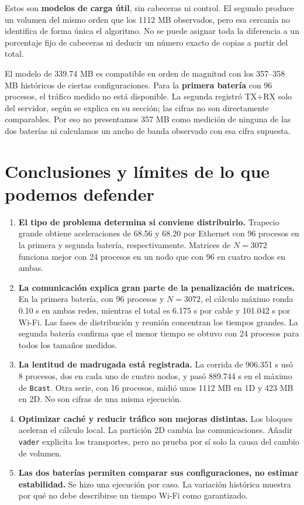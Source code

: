 Estos son \textbf{modelos de carga útil}, sin cabeceras ni control. El segundo produce un volumen del mismo orden que los 1112 MB observados, pero esa cercanía no identifica de forma única el algoritmo. No se puede asignar toda la diferencia a un porcentaje fijo de cabeceras ni deducir un número exacto de copias a partir del total.

El modelo de 339.74 MB es compatible en orden de magnitud con los 357--358 MB históricos de ciertas configuraciones. Para la \textbf{primera batería} con 96 procesos, el tráfico medido no está disponible. La segunda registró TX+RX solo del servidor, según se explica en su sección; las cifras no son directamente comparables. Por eso no presentamos 357 MB como medición de ninguna de las dos baterías ni calculamos un ancho de banda observado con esa cifra supuesta.

\clearpage
\section{Conclusiones y límites de lo que podemos defender}

\begin{enumerate}
\item \textbf{El tipo de problema determina si conviene distribuirlo.} Trapecio grande obtiene aceleraciones de 68.56 y 68.20 por Ethernet con 96 procesos en la primera y segunda batería, respectivamente. Matrices de $N=3072$ funciona mejor con 24 procesos en un nodo que con 96 en cuatro nodos en ambas.
\item \textbf{La comunicación explica gran parte de la penalización de matrices.} En la primera batería, con 96 procesos y $N=3072$, el cálculo máximo ronda 0.10 s en ambas redes, mientras el total es 6.175 s por cable y 101.042 s por Wi-Fi. Las fases de distribución y reunión concentran los tiempos grandes. La segunda batería confirma que el menor tiempo se obtuvo con 24 procesos para todos los tamaños medidos.
\item \textbf{La lentitud de madrugada está registrada.} La corrida de 906.351 s usó 8 procesos, dos en cada uno de cuatro nodos, y pasó 889.744 s en el máximo de \texttt{Bcast}. Otra serie, con 16 procesos, midió unos 1112 MB en 1D y 423 MB en 2D. No son cifras de una misma ejecución.
\item \textbf{Optimizar caché y reducir tráfico son mejoras distintas.} Los bloques aceleran el cálculo local. La partición 2D cambia las comunicaciones. Añadir \texttt{vader} explicita los transportes, pero no prueba por sí solo la causa del cambio de volumen.
\item \textbf{Las dos baterías permiten comparar sus configuraciones, no estimar estabilidad.} Se hizo una ejecución por caso. La variación histórica muestra por qué no debe describirse un tiempo Wi-Fi como garantizado.
\end{enumerate}

